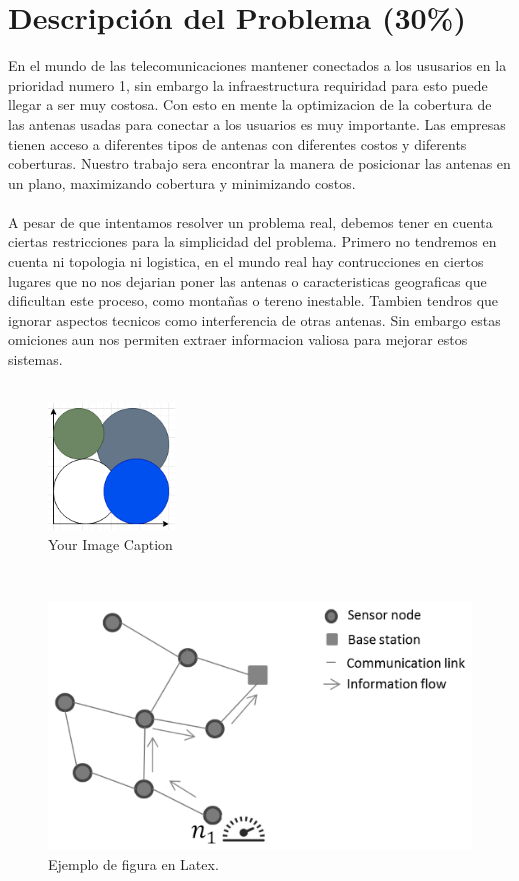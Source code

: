 \documentclass[runningheads]{llncs}
\begin{document}
\section{Descripci\'{o}n del Problema (30\%)}
En el mundo de las telecomunicaciones mantener conectados a los ususarios en la prioridad numero 1, sin embargo la infraestructura requiridad para esto puede llegar a ser muy costosa. Con esto en mente la optimizacion de la cobertura de las antenas usadas para conectar a los usuarios es muy importante. Las empresas tienen acceso a diferentes tipos de antenas con diferentes costos y diferents coberturas. Nuestro trabajo sera encontrar la manera de posicionar las antenas en un plano, maximizando cobertura y minimizando costos.
\\ \\
A pesar de que intentamos resolver un problema real, debemos tener en cuenta ciertas restricciones para la simplicidad del problema. Primero no tendremos en cuenta ni topologia ni logistica, en el mundo real hay contrucciones en ciertos lugares que no nos dejarian poner las antenas o caracteristicas geograficas que dificultan este proceso, como montañas o tereno inestable. Tambien tendros que ignorar aspectos tecnicos como interferencia de otras antenas. Sin embargo estas omiciones aun nos permiten extraer informacion valiosa para mejorar estos sistemas.
\\ \\
\begin{figure}
	\centering
	\includegraphics[width=0.3\textwidth]{plot3.png}
	\caption{Your Image Caption}
	\label{fig:your-image}
\end{figure}
\\



\begin{figure}[h]
	\begin{center}
		\centerline{\includegraphics[scale=0.8]{./figures/network.eps}}
		\caption{Ejemplo de figura en Latex. \label{Fig:fig2}}
	\end{center}
\end{figure}
\end{document}
